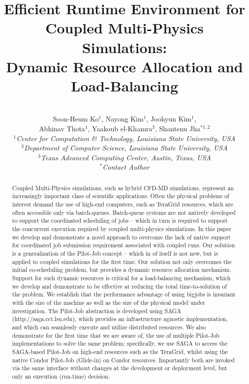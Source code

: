 \documentclass[conference,final]{IEEEtran}
\title{Efficient Runtime Environment for Coupled Multi-Physics Simulations: \\
Dynamic Resource Allocation and Load-Balancing}
\author{
 ~\\[-2em]
 Soon-Heum Ko$^{1}$, Nayong Kim$^{1}$, Joohyun Kim$^{1}$, \\ Abhinav Thota$^{1}$, Yaakoub el-Khamra$^{3}$, Shantenu Jha$^{*1,2}$\\
 \small{\emph{$^{1}$Center for Computation \& Technology, Louisiana State University, USA}}\\
 \small{\emph{$^{2}$Department of Computer Science, Louisiana State University, USA}}\\
 \small{\emph{$^{3}$Texas Advanced Computing Center, Austin, Texas, USA}}\\
 \small{\emph{$^{*}$Contact Author}}\\
}
\newcommand{\up}{\vspace*{-1em}}
\begin{document}
\maketitle

\begin{abstract}
  Coupled Multi-Physics simulations, such as hybrid CFD-MD
  simulations, represent an increasingly important class of scientific
  applications.  Often the physical problems of interest demand the
  use of high-end computers, such as TeraGrid resources, which are
  often accessible only via batch-queues. Batch-queue systems are not
  natively developed to support the coordinated scheduling of jobs --
  which in turn is required to support the concurrent execution
  required by coupled multi-physics simulations. In this paper we
  develop and demonstrate a novel approach to overcome the lack of
  native support for coordinated job submission requirement associated
  with coupled runs. Our solution is a generalization of the Pilot-Job
  concept -- which in of itself is not new, but is applied to coupled
  simulations for the first time. Our solution not only overcomes the
  initial co-scheduling problem, but provides a dynamic resource
  allocation mechanism. Support for such dynamic resources is critical
  for a load-balancing mechanism, which we develop and demonstrate to
  be effective at reducing the total time-to-solution of the
  problem. We establish that the performance advantage of using
  bigjobs is invariant with the size of the machine as well as the
  size of the physical model under investigation.  The Pilot-Job
  abstraction is developed using SAGA (http://saga.cct.lsu.edu), which
  provides an infrastructure agnostic implementation, and which can
  seamlessly execute and utilize distributed resources. We also
  demonstrate for the first time that we are aware of, the use of
  multiple Pilot-Job implementations to solve the same problem;
  specifically, we use SAGA to access the SAGA-based Pilot-Job on
  high-end resources such as the TeraGrid, whilst using the native
  Condor Pilot-Job (Glide-in) on Condor resources. Importantly both
  are invoked via the same interface without changes at the
  development or deployment level, but only an execution (run-time)
  decision.
\end{abstract}
\up\up
\end{document}
